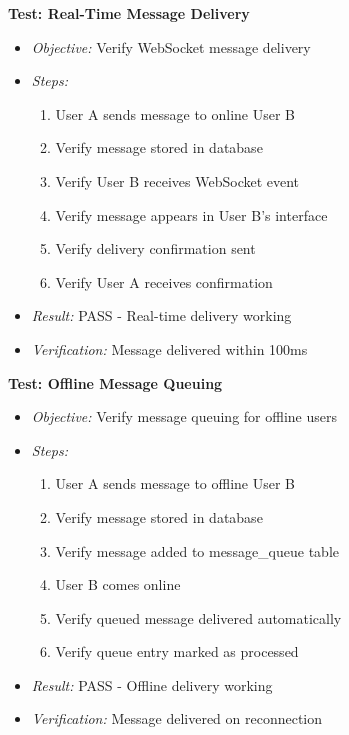 \textbf{Test: Real-Time Message Delivery}
\begin{itemize}
    \item \textit{Objective:} Verify WebSocket message delivery
    \item \textit{Steps:}
    \begin{enumerate}
        \item User A sends message to online User B
        \item Verify message stored in database
        \item Verify User B receives WebSocket event
        \item Verify message appears in User B's interface
        \item Verify delivery confirmation sent
        \item Verify User A receives confirmation
    \end{enumerate}
    \item \textit{Result:} PASS - Real-time delivery working
    \item \textit{Verification:} Message delivered within 100ms
\end{itemize}

\textbf{Test: Offline Message Queuing}
\begin{itemize}
    \item \textit{Objective:} Verify message queuing for offline users
    \item \textit{Steps:}
    \begin{enumerate}
        \item User A sends message to offline User B
        \item Verify message stored in database
        \item Verify message added to message\_queue table
        \item User B comes online
        \item Verify queued message delivered automatically
        \item Verify queue entry marked as processed
    \end{enumerate}
    \item \textit{Result:} PASS - Offline delivery working
    \item \textit{Verification:} Message delivered on reconnection
\end{itemize}

